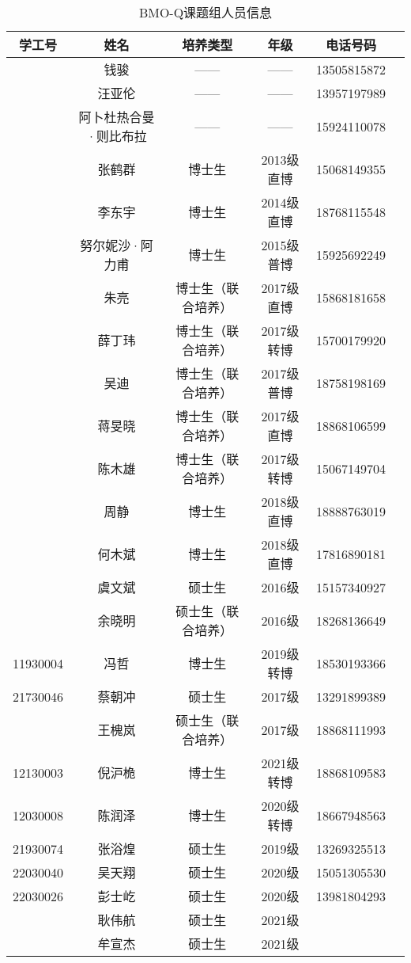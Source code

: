 \documentclass[cn,11pt,chinese]{elegantbook}
\begin{document}
\begin{table}[h]
  \centering
  \caption{BMO-Q课题组人员信息}
\begin{tabular}{cccccc}
\toprule
学工号 & 姓名 & 培养类型 & 年级 &电话号码 \\
\midrule
& 钱骏	&——&	——	&13505815872 \\
\hline
\hline
& 汪亚伦&	——&	——	&13957197989\\
&阿卜杜热合曼·则比布拉&	——&	——	&15924110078\\
&张鹤群&	博士生&	2013级直博	&15068149355\\
&李东宇&	博士生	&2014级直博&	18768115548\\
&努尔妮沙·阿力甫&	博士生&	2015级普博&	15925692249\\
&朱亮&	博士生（联合培养）&	2017级直博	&15868181658\\
&薛丁玮	&博士生（联合培养）	&2017级转博	&15700179920\\
&吴迪&	博士生（联合培养）&	2017级普博&	18758198169\\
&蒋旻晓&	博士生（联合培养）&	2017级直博&	18868106599\\
&陈木雄	&博士生（联合培养）&	2017级转博&	15067149704\\
&周静	&博士生	&2018级直博&	18888763019\\
&何木斌&	博士生&	2018级直博&	17816890181\\
&虞文斌	&硕士生&	2016级&	15157340927\\ 
&余晓明	&硕士生（联合培养）&	2016级	&18268136649\\
11930004&冯哲&	博士生&	2019级转博 &	18530193366\\
21730046&蔡朝冲&	硕士生&	2017级&	13291899389\\
&王槐岚	&硕士生（联合培养）&	2017级	&18868111993\\
12130003&倪沪桅	&博士生&	2021级转博&	18868109583\\
12030008&	陈润泽& 博士生&2020级转博&18667948563\\
21930074&张浴煌&硕士生&2019级& 13269325513\\
22030040	&吴天翔& 硕士生&2020级& 15051305530\\
22030026  &彭士屹&硕士生 &2020级 &13981804293 \\
&耿伟航&硕士生&2021级&\\
&牟宣杰&硕士生&2021级&\\

\bottomrule
\end{tabular}%
\label{tab:info}%

\end{table}
\end{document}
